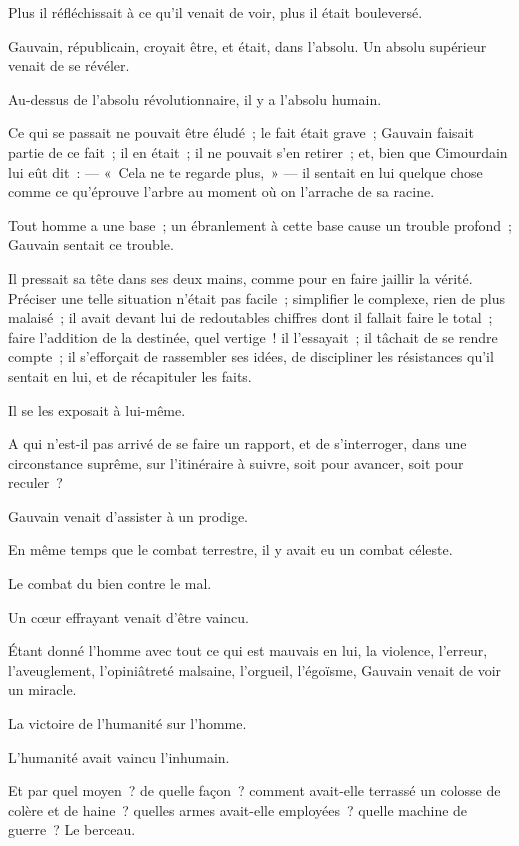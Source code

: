 \documentclass[french,twoside]{book} %
\begin{document}
Plus il réfléchissait à ce qu’il venait de voir, plus il était bouleversé.\par
Gauvain, républicain, croyait être, et était, dans l’absolu. Un absolu supérieur venait de se révéler.\par
Au-dessus de l’absolu révolutionnaire, il y a l’absolu humain.\par
Ce qui se passait ne pouvait être éludé ; le fait était grave ; Gauvain faisait partie de ce fait ; il en était ; il ne pouvait s’en retirer ; et, bien que Cimourdain lui eût dit : — « Cela ne te regarde plus, » — il sentait en lui quelque chose comme ce qu’éprouve l’arbre au moment où on l’arrache de sa racine.\par
Tout homme a une base ; un ébranlement à cette base cause un trouble profond ; Gauvain sentait ce trouble.\par
Il pressait sa tête dans ses deux mains, comme  pour en faire jaillir la vérité. Préciser une telle situation n’était pas facile ; simplifier le complexe, rien de plus malaisé ; il avait devant lui de redoutables chiffres dont il fallait faire le total ; faire l’addition de la destinée, quel vertige ! il l’essayait ; il tâchait de se rendre compte ; il s’efforçait de rassembler ses idées, de discipliner les résistances qu’il sentait en lui, et de récapituler les faits.\par
Il se les exposait à lui-même.\par
A qui n’est-il pas arrivé de se faire un rapport, et de s’interroger, dans une circonstance suprême, sur l’itinéraire à suivre, soit pour avancer, soit pour reculer ?\par
Gauvain venait d’assister à un prodige.\par
En même temps que le combat terrestre, il y avait eu un combat céleste.\par
Le combat du bien contre le mal.\par
Un cœur effrayant venait d’être vaincu.\par
Étant donné l’homme avec tout ce qui est mauvais en lui, la violence, l’erreur, l’aveuglement, l’opiniâtreté malsaine, l’orgueil, l’égoïsme, Gauvain venait de voir un miracle.\par
La victoire de l’humanité sur l’homme.\par
L’humanité avait vaincu l’inhumain.\par
Et par quel moyen ? de quelle façon ? comment avait-elle terrassé un colosse de colère et de haine ? quelles armes avait-elle employées ? quelle machine de guerre ? Le berceau.\par
\end{document}
